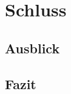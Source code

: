 \documentclass[a4paper]{article}
\begin{document}
\section{Schluss}
\label{sec:schluss}

\subsection{Ausblick}
\label{sub:ausblick}

\subsection{Fazit}
\label{sub:fazit}


\newpage


\printbibliography

%

%
\end{document}
